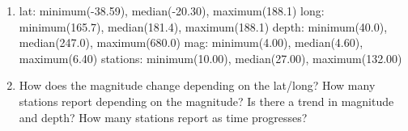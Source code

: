 \documentclass[]{article}
\begin{document}
\begin{enumerate}
\def\labelenumi{\arabic{enumi}.}
\setcounter{enumi}{4}
\item
  lat: minimum(-38.59), median(-20.30), maximum(188.1) long:
  minimum(165.7), median(181.4), maximum(188.1) depth: minimum(40.0),
  median(247.0), maximum(680.0) mag: minimum(4.00), median(4.60),
  maximum(6.40) stations: minimum(10.00), median(27.00), maximum(132.00)
\item
  How does the magnitude change depending on the lat/long? How many
  stations report depending on the magnitude? Is there a trend in
  magnitude and depth? How many stations report as time progresses?
\end{enumerate}
\end{document}
